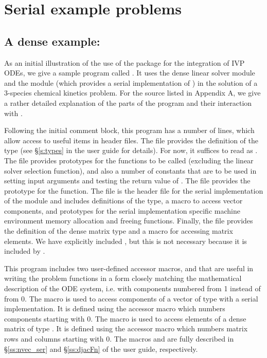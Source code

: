 \section{Serial example problems}\label{s:ex_serial}

\subsection{A dense example: }\label{ss:cvdx}

As an initial illustration of the use of the {\cvode} package for the
integration of IVP ODEs, we give a sample program called .
It uses the {\cvode} dense linear solver module {\cvdense} 
and the {\nvecs} module (which provides a serial implementation of {\nvector})
in the solution of a 3-species chemical kinetics problem.
For the source listed in Appendix A, we give a rather detailed explanation
of the parts of the program and their interaction with {\cvode}.

Following the initial comment block, this program has a number
of  lines, which allow access to useful items in {\cvode}
header files.  The  file provides the definition of the
type  (see \S\ref{s:types} in the user guide for
details).  For now, it suffices to read  as .
The  file provides prototypes for the {\cvode}
functions to be called (excluding the linear solver selection
function), and also a number of constants that are to be used in
setting input arguments and testing the return value of .
The  file provides the prototype for the  function.
The  file is the header file for the serial
implementation of the {\nvector} module and includes definitions of the 
 type, a macro to access vector components, and prototypes 
for the serial implementation specific machine environment memory allocation
and freeing functions.
Finally, the  file provides the definition of the dense
matrix type  and a macro for accessing matrix elements.
We have explicitly included , but this is not necessary because 
it is included by .

This program includes two user-defined accessor macros,  and
 that are useful in writing the problem functions in a form
closely matching the mathematical description of the ODE system,
i.e. with components numbered from 1 instead of from 0.  The 
macro is used to access components of a vector of type 
with a serial implementation.  It is defined using the {\nvecs}
accessor macro  which numbers components starting with
0. The  macro is used to access elements of a dense matrix of
type . It is defined using the {\dense} accessor macro
 which numbers matrix rows and columns starting with
0. The macros  and  are fully described
in \S\ref{ss:nvec_ser} and \S\ref{ss:djacFn} of the user guide,
respectively.

